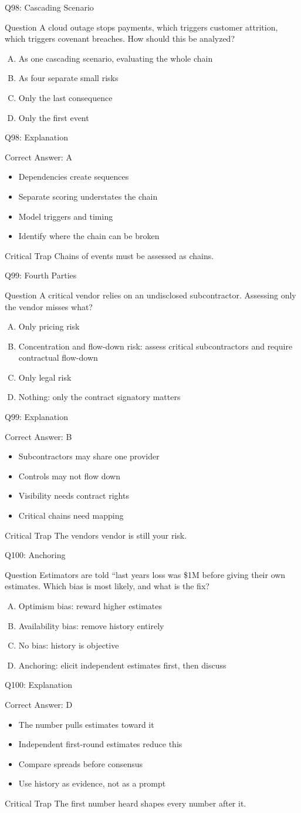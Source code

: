 \documentclass[aspectratio=169]{beamer}
\newcommand{\hq}[7]{%
  \begin{frame}{Q#1: #2}
    \begin{block}{Question}
      #3
    \end{block}
    \begin{enumerate}[(A)]
      #4
    \end{enumerate}
  \end{frame}
  \begin{frame}{Q#1: Explanation}
    \begin{block}{Correct Answer: #5}
      \begin{itemize}
        #6
      \end{itemize}
    \end{block}
    \begin{alertblock}{Critical Trap}
      #7
    \end{alertblock}
  \end{frame}
}
\begin{document}
\hq{98}{Cascading Scenario}
{A cloud outage stops payments, which triggers customer attrition, which triggers covenant breaches. How should this be analyzed?}
{\item As one cascading scenario, evaluating the whole chain
 \item As four separate small risks
 \item Only the last consequence
 \item Only the first event}
{A}
{\item Dependencies create sequences
 \item Separate scoring understates the chain
 \item Model triggers and timing
 \item Identify where the chain can be broken}
{Chains of events must be assessed as chains.}

\hq{99}{Fourth Parties}
{A critical vendor relies on an undisclosed subcontractor. Assessing only the vendor misses what?}
{\item Only pricing risk
 \item Concentration and flow-down risk: assess critical subcontractors and require contractual flow-down
 \item Only legal risk
 \item Nothing: only the contract signatory matters}
{B}
{\item Subcontractors may share one provider
 \item Controls may not flow down
 \item Visibility needs contract rights
 \item Critical chains need mapping}
{The vendor\textquotesingle s vendor is still your risk.}

\hq{100}{Anchoring}
{Estimators are told ``last year\textquotesingle s loss was \$1M before giving their own estimates. Which bias is most likely, and what is the fix?}
{\item Optimism bias: reward higher estimates
 \item Availability bias: remove history entirely
 \item No bias: history is objective
 \item Anchoring: elicit independent estimates first, then discuss}
{D}
{\item The number pulls estimates toward it
 \item Independent first-round estimates reduce this
 \item Compare spreads before consensus
 \item Use history as evidence, not as a prompt}
{The first number heard shapes every number after it.}
\end{document}
